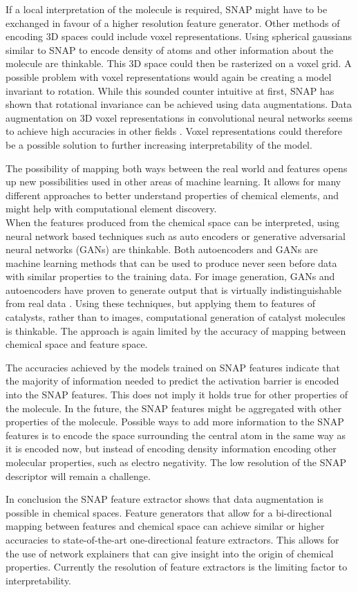 If a local interpretation of the molecule is required, SNAP might have to be exchanged in favour of a higher resolution 
feature generator.
Other methods of encoding 3D spaces could include voxel representations.
Using spherical gaussians similar to SNAP to encode density of atoms and other information about the molecule are thinkable.
This 3D space could then be rasterized on a voxel grid.
A possible problem with voxel representations would again be creating a model invariant to rotation.
While this sounded counter intuitive at first, SNAP has shown that rotational invariance can be achieved using data augmentations.
Data augmentation on 3D voxel representations in convolutional neural networks seems to achieve high accuracies in 
other fields \cite{7353481}.
Voxel representations could therefore be a possible solution to further increasing interpretability of the model.

The possibility of mapping both ways between the real world and features opens up new possibilities 
used in other areas of machine learning.
It allows for many different approaches to better understand properties of chemical elements, 
and might help with computational element discovery.
\\

When the features produced from the chemical space can be interpreted,
using neural network based techniques such as auto encoders or generative adversarial neural networks (GANs) are thinkable.
Both autoencoders and GANs are machine learning methods that can be used to produce never seen before data with similar properties
to the training data.
For image generation, GANs and autoencoders have proven to generate output that is virtually indistinguishable from real data \cite{karras2019stylebased}.
Using these techniques, but applying them to features of catalysts, rather than to images, computational generation of catalyst molecules is thinkable.
The approach is again limited by the accuracy of mapping between chemical space and feature space.

The accuracies achieved by the models trained on SNAP features indicate that 
the majority of information needed to predict the activation barrier is encoded into the SNAP features.
This does not imply it holds true for other properties of the molecule.
In the future, the SNAP features might be aggregated with other properties of the molecule.
Possible ways to add more information to the SNAP features is to encode the space surrounding the 
central atom in the same way as it is encoded now, but instead of encoding density information encoding 
other molecular properties, such as electro negativity.
The low resolution of the SNAP descriptor will remain a challenge.

In conclusion the SNAP feature extractor shows that data augmentation is possible in chemical spaces.
Feature generators that allow for a bi-directional mapping between features and chemical space can achieve similar or higher
accuracies to state-of-the-art one-directional feature extractors.
This allows for the use of network explainers that can give insight into the origin of chemical properties.
Currently the resolution of feature extractors is the limiting factor to interpretability.